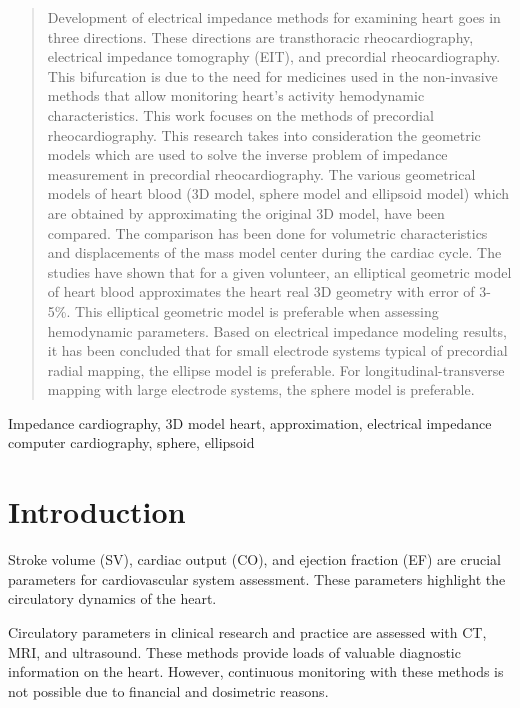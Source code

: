 \documentclass[conference]{IEEEtran}
\begin{document}
\begin{abstract}

    Development of electrical impedance methods for examining heart goes in three directions.
    These directions are transthoracic rheocardiography, electrical impedance tomography (EIT), and precordial rheocardiography.
    This bifurcation is due to the need for medicines used in the non-invasive methods that allow monitoring heart’s activity hemodynamic characteristics.
    This work focuses on the methods of precordial rheocardiography.
    This research takes into consideration the geometric models which are used to solve the inverse problem of impedance measurement in precordial rheocardiography.
    The various geometrical models of heart blood (3D model, sphere model and ellipsoid model) which are obtained by approximating the original 3D model, have been compared.
    The comparison has been done for volumetric characteristics and displacements of the mass model center during the cardiac cycle.
    The studies have shown that for a given volunteer, an elliptical geometric model of heart blood approximates the heart real 3D geometry with error of 3-5\%.
    This elliptical geometric model is preferable when assessing hemodynamic parameters.
    Based on electrical impedance modeling results, it has been concluded that for small electrode systems typical of precordial radial mapping, the ellipse model is preferable.
    For longitudinal-transverse mapping with large electrode systems, the sphere model is preferable.

\end{abstract}

\begin{IEEEkeywords}
    Impedance cardiography, 3D model heart, approximation, electrical impedance computer cardiography, sphere, ellipsoid
\end{IEEEkeywords}

\section{Introduction}

Stroke volume (SV), cardiac output (CO), and ejection fraction (EF) are crucial parameters for cardiovascular system assessment.
These parameters highlight the circulatory dynamics of the heart.

Circulatory parameters in clinical research and practice are assessed with CT, MRI, and ultrasound.
These methods provide loads of valuable diagnostic information on the heart.
However, continuous monitoring with these methods is not possible due to financial and dosimetric reasons.
\end{document}
